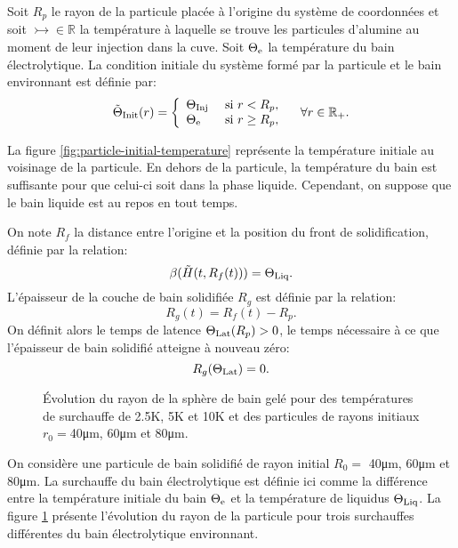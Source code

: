 Soit $R_p$ le rayon de la particule placée à l'origine du système de
coordonnées et soit $\tinj\in\mathbb R$ la température à laquelle se
trouve les particules d'alumine au moment de leur injection dans la
cuve. Soit $\Theta_\mathrm{e}$ la température du bain électrolytique. La
condition initiale du système formé par la particule et le bain
environnant est définie par:
\begin{equation}
  \tilde{\Theta}_\text{Init}(r) = \left\{
  \begin{array}{ll}
    \Theta_\text{Inj} & \text{ si } r < R_p,\\
    \Theta_\mathrm{e} & \text{ si } r \geq R_p,\\
  \end{array}
  \right.\quad \forall r\in \mathbb R_+ .\label{eq:initial-temperature}
\end{equation}

La figure \ref{fig:particle-initial-temperature} représente la
température initiale au voisinage de la particule. En dehors de la
particule, la température du bain est suffisante pour que celui-ci
soit dans la phase liquide. Cependant, on suppose que le bain liquide
est au repos en tout temps.

On note $R_f$ la distance entre l'origine et la position du front de
solidification, définie par la relation:
\begin{equation}
\beta(\tilde{H}(t, R_f(t))) = \Theta_\text{Liq}.
\end{equation}
L'épaisseur de la couche de bain solidifiée $R_g$ est définie par la
relation:
\begin{equation}
R_g(t) = R_f(t) - R_p.
\end{equation}
On définit alors le temps de latence $\Theta_\text{Lat}(R_p) > 0$, le temps
nécessaire à ce que l'épaisseur de bain solidifié atteigne à nouveau
zéro:
\begin{equation}
  R_g(\Theta_\text{Lat}) = 0.
\end{equation}

\begin{figure}
\begin{center}
  
  
  
  \caption{Évolution du rayon de la sphère de bain gelé pour des
    températures de surchauffe de \num{2.5}\si{\kelvin},
    \num{5}\si{\kelvin} et \num{10}\si{\kelvin} et des particules de
    rayons initiaux $r_0 = $\num{40}\si{\micro\meter},
    \num{60}\si{\micro\meter} et \num{80}\si{\micro\meter}.}
  \label{fig:freeze-radius}
\end{center}
\end{figure}
On considère une particule de bain solidifié de rayon initial $R_0 =$
\num{40}\si{\micro\meter}, \num{60}\si{\micro\meter} et
\num{80}\si{\micro\meter}. La surchauffe du bain électrolytique est
définie ici comme la différence entre la température initiale du bain
$\Theta_\mathrm{e}$ et la température de liquidus $\Theta_\text{Liq}$. La figure
\ref{fig:freeze-radius} présente l'évolution du rayon de la particule
pour trois surchauffes différentes du bain électrolytique environnant.

